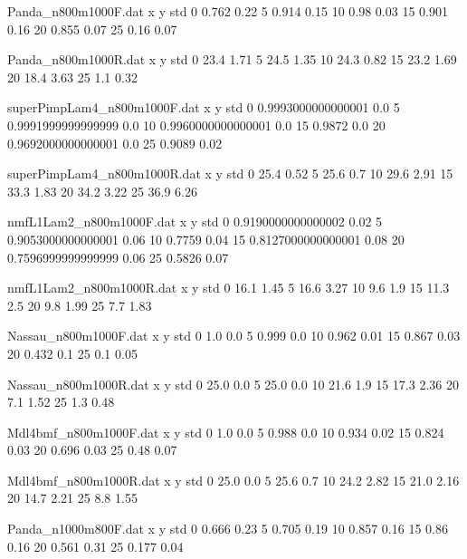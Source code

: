 \begin{filecontents}{Panda_n800m1000F.dat}
x y std
0 0.762 0.22
5 0.914 0.15
10 0.98 0.03
15 0.901 0.16
20 0.855 0.07
25 0.16 0.07
\end{filecontents}
\begin{filecontents}{Panda_n800m1000R.dat}
x y std
0 23.4 1.71
5 24.5 1.35
10 24.3 0.82
15 23.2 1.69
20 18.4 3.63
25 1.1 0.32
\end{filecontents}
\begin{filecontents}{superPimpLam4_n800m1000F.dat}
x y std
0 0.9993000000000001 0.0
5 0.9991999999999999 0.0
10 0.9960000000000001 0.0
15 0.9872 0.0
20 0.9692000000000001 0.0
25 0.9089 0.02
\end{filecontents}
\begin{filecontents}{superPimpLam4_n800m1000R.dat}
x y std
0 25.4 0.52
5 25.6 0.7
10 29.6 2.91
15 33.3 1.83
20 34.2 3.22
25 36.9 6.26
\end{filecontents}
\begin{filecontents}{nmfL1Lam2_n800m1000F.dat}
x y std
0 0.9190000000000002 0.02
5 0.9053000000000001 0.06
10 0.7759 0.04
15 0.8127000000000001 0.08
20 0.7596999999999999 0.06
25 0.5826 0.07
\end{filecontents}
\begin{filecontents}{nmfL1Lam2_n800m1000R.dat}
x y std
0 16.1 1.45
5 16.6 3.27
10 9.6 1.9
15 11.3 2.5
20 9.8 1.99
25 7.7 1.83
\end{filecontents}
\begin{filecontents}{Nassau_n800m1000F.dat}
x y std
0 1.0 0.0
5 0.999 0.0
10 0.962 0.01
15 0.867 0.03
20 0.432 0.1
25 0.1 0.05
\end{filecontents}
\begin{filecontents}{Nassau_n800m1000R.dat}
x y std
0 25.0 0.0
5 25.0 0.0
10 21.6 1.9
15 17.3 2.36
20 7.1 1.52
25 1.3 0.48
\end{filecontents}
\begin{filecontents}{Mdl4bmf_n800m1000F.dat}
x y std
0 1.0 0.0
5 0.988 0.0
10 0.934 0.02
15 0.824 0.03
20 0.696 0.03
25 0.48 0.07
\end{filecontents}
\begin{filecontents}{Mdl4bmf_n800m1000R.dat}
x y std
0 25.0 0.0
5 25.6 0.7
10 24.2 2.82
15 21.0 2.16
20 14.7 2.21
25 8.8 1.55
\end{filecontents}
\begin{filecontents}{Panda_n1000m800F.dat}
x y std
0 0.666 0.23
5 0.705 0.19
10 0.857 0.16
15 0.86 0.16
20 0.561 0.31
25 0.177 0.04
\end{filecontents}
